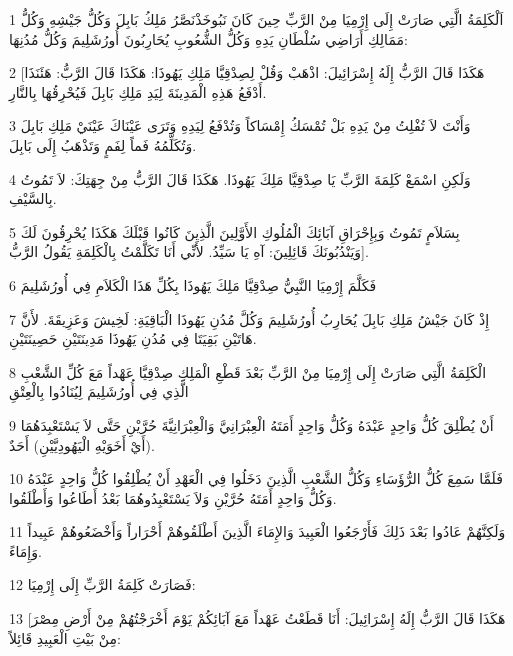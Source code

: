 \par 1 اَلْكَلِمَةُ الَّتِي صَارَتْ إِلَى إِرْمِيَا مِنْ الرَّبِّ حِينَ كَانَ نَبُوخَذْنَصَّرُ مَلِكُ بَابِلَ وَكُلُّ جَيْشِهِ وَكُلُّ مَمَالِكِ أَرَاضِي سُلْطَانِ يَدِهِ وَكُلُّ الشُّعُوبِ يُحَارِبُونَ أُورُشَلِيمَ وَكُلُّ مُدُنِهَا:
\par 2 [هَكَذَا قَالَ الرَّبُّ إِلَهُ إِسْرَائِيلَ: اذْهَبْ وَقُلْ لِصِدْقِيَّا مَلِكِ يَهُوذَا: هَكَذَا قَالَ الرَّبُّ: هَئَنَذَا أَدْفَعُ هَذِهِ الْمَدِينَةَ لِيَدِ مَلِكِ بَابِلَ فَيُحْرِقُهَا بِالنَّارِ.
\par 3 وَأَنْتَ لاَ تُفْلِتُ مِنْ يَدِهِ بَلْ تُمْسَكُ إِمْسَاكاً وَتُدْفَعُ لِيَدِهِ وَتَرَى عَيْنَاكَ عَيْنَيْ مَلِكِ بَابِلَ وَتُكَلِّمُهُ فَماً لِفَمٍ وَتَذْهَبُ إِلَى بَابِلَ.
\par 4 وَلَكِنِ اسْمَعْ كَلِمَةَ الرَّبِّ يَا صِدْقِيَّا مَلِكَ يَهُوذَا. هَكَذَا قَالَ الرَّبُّ مِنْ جِهَتِكَ: لاَ تَمُوتُ بِالسَّيْفِ.
\par 5 بِسَلاَمٍ تَمُوتُ وَبِإِحْرَاقِ آبَائِكَ الْمُلُوكِ الأَوَّلِينَ الَّذِينَ كَانُوا قَبْلَكَ هَكَذَا يُحْرِقُونَ لَكَ وَيَنْدُبُونَكَ قَائِلِينَ: آهِ يَا سَيِّدُ. لأَنِّي أَنَا تَكَلَّمْتُ بِالْكَلِمَةِ يَقُولُ الرَّبُّ].
\par 6 فَكَلَّمَ إِرْمِيَا النَّبِيُّ صِدْقِيَّا مَلِكَ يَهُوذَا بِكُلِّ هَذَا الْكَلاَمِ فِي أُورُشَلِيمَ
\par 7 إِذْ كَانَ جَيْشُ مَلِكِ بَابِلَ يُحَارِبُ أُورُشَلِيمَ وَكُلَّ مُدُنِ يَهُوذَا الْبَاقِيَةِ: لَخِيشَ وَعَزِيقَةَ. لأَنَّ هَاتَيْنِ بَقِيَتَا فِي مُدُنِ يَهُوذَا مَدِينَتَيْنِ حَصِينَتَيْنِ.
\par 8 الْكَلِمَةُ الَّتِي صَارَتْ إِلَى إِرْمِيَا مِنْ الرَّبِّ بَعْدَ قَطْعِ الْمَلِكِ صِدْقِيَّا عَهْداً مَعَ كُلِّ الشَّعْبِ الَّذِي فِي أُورُشَلِيمَ لِيُنَادُوا بِالْعِتْقِ
\par 9 أَنْ يُطْلِقَ كُلُّ وَاحِدٍ عَبْدَهُ وَكُلُّ وَاحِدٍ أَمَتَهُ الْعِبْرَانِيَّ وَالْعِبْرَانِيَّةَ حُرَّيْنِ حَتَّى لاَ يَسْتَعْبِدَهُمَا (أَيْ أَخَوَيْهِ الْيَهُودِيَّيْنِ) أَحَدٌ.
\par 10 فَلَمَّا سَمِعَ كُلُّ الرُّؤَسَاءِ وَكُلُّ الشَّعْبِ الَّذِينَ دَخَلُوا فِي الْعَهْدِ أَنْ يُطْلِقُوا كُلُّ وَاحِدٍ عَبْدَهُ وَكُلُّ وَاحِدٍ أَمَتَهُ حُرَّيْنِ وَلاَ يَسْتَعْبِدُوهُمَا بَعْدُ أَطَاعُوا وَأَطْلَقُوا.
\par 11 وَلَكِنَّهُمْ عَادُوا بَعْدَ ذَلِكَ فَأَرْجَعُوا الْعَبِيدَ وَالإِمَاءَ الَّذِينَ أَطْلَقُوهُمْ أَحْرَاراً وَأَخْضَعُوهُمْ عَبِيداً وَإِمَاءً.
\par 12 فَصَارَتْ كَلِمَةُ الرَّبِّ إِلَى إِرْمِيَا:
\par 13 [هَكَذَا قَالَ الرَّبُّ إِلَهُ إِسْرَائِيلَ: أَنَا قَطَعْتُ عَهْداً مَعَ آبَائِكُمْ يَوْمَ أَخْرَجْتُهُمْ مِنْ أَرْضِ مِصْرَ مِنْ بَيْتِ الْعَبِيدِ قَائِلاً:
